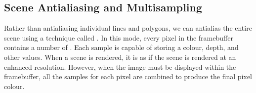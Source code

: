 \documentclass[../COS3712_Notes.tex]{subfiles}
\begin{document}
      \subsection{Scene Antialiasing and Multisampling}
        Rather than antialiasing individual lines and polygons, we can antialias the entire scene
        using a technique called .
        In this mode, every pixel in the framebuffer contains a number of .
        Each sample is capable of storing a colour, depth, and other values.
        When a scene is rendered, it is as if the scene is rendered at an enhanced resolution.
        However, when the image must be displayed within the framebuffer,
        all the samples for each pixel are combined to produce the final pixel colour.

\end{document}
